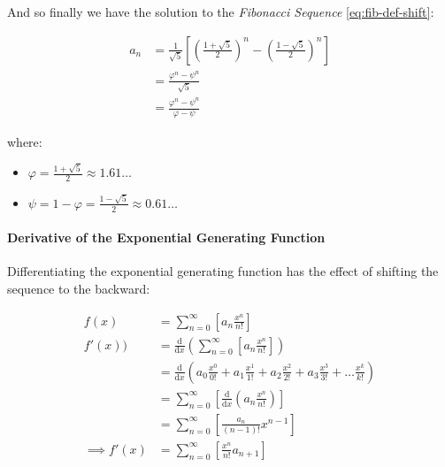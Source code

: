 \documentclass[11pt]{article}
\begin{document}
And so finally we have the solution to the \emph{Fibonacci Sequence} \ref{eq:fib-def-shift}:


\begin{align}
    a_n &= \frac{1}{\sqrt{5} } \left[ \left( \frac{1+  \sqrt{5} }{2}  \right)^n -  \left( \frac{1- \sqrt{5} }{2} \right)^n \right] \nonumber \\
&= \frac{\varphi^n - \psi^n}{\sqrt{5} } \nonumber\\
&=\frac{\varphi^n -  \psi^n}{\varphi - \psi} \label{eq:fib-sol}
\end{align}


where:

\begin{itemize}
\item \(\varphi = \frac{1+ \sqrt{5} }{2} \approx 1.61\ldots\)
\item \(\psi = 1-\varphi = \frac{1- \sqrt{5} }{2} \approx 0.61\ldots\)
\end{itemize}

\paragraph{Derivative of the Exponential Generating Function}
\label{Derivative-exp-gen-function}
Differentiating the exponential generating function has the effect of shifting the sequence to the backward: \cite{lehmanReadingsMathematicsComputer2010}

\begin{align}
    f\left( x \right) &= \sum^{\infty}_{n= 0}   \left[ a_n \frac{x^n}{n!} \right] \label{eq:exp-pow-series} \\
f'\left( x \right)) &= \frac{\mathrm{d} }{\mathrm{d} x}\left( \sum^{\infty}_{n= 0}   \left[ a_n \frac{x^n}{n!} \right]  \right) \nonumber \\
&= \frac{\mathrm{d}}{\mathrm{d} x} \left( a_0 \frac{x^0}{0!} +  a_1 \frac{x^1}{1!} +  a_2 \frac{x^2}{2!}+  a_3 \frac{x^3}{3! } +  \ldots \frac{x^k}{k!} \right) \nonumber \\
&= \sum^{\infty}_{n= 0}   \left[ \frac{\mathrm{d} }{\mathrm{d} x}\left( a_n \frac{x^n}{n!} \right) \right] \nonumber \\
&= \sum^{\infty}_{n= 0}   {\left[{ \frac{a_n}{{\left({ n- 1 }\right)!}} } x^{n- 1}  \right]} \nonumber \\
\implies f'(x) &= \sum^{\infty}_{n= 0}   {\left[{ \frac{x^n}{n!}a_{n+  1} }\right]} \label{eq:exp-pow-series-sol}
\end{align}
\end{document}
